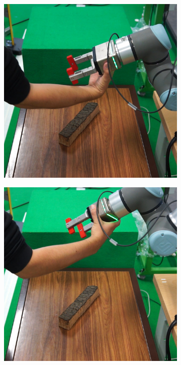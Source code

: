 \begin{figure}[h]
    \centering
    \begin{subfigure}{.2\linewidth}
        \centering
        \includegraphics[width=.95\linewidth]{figs/chp6/hg_test_0.jpg}
    \end{subfigure}%
    \begin{subfigure}{.2\linewidth}
        \centering
        \includegraphics[width=.95\linewidth]{figs/chp6/hg_test_1.jpg}

\end{subfigure}
\end{figure}
